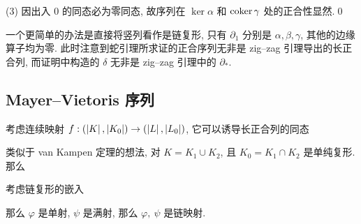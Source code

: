 \begin{Proof}
	(3) 因出入 $ 0 $ 的同态必为零同态, 故序列在 $ \ker\alpha $ 和 $ \mathrm{coker}\,\gamma $ 处的正合性显然.\qed
\end{Proof}

一个更简单的办法是直接将竖列看作是链复形, 只有 $ \partial_1 $ 分别是 $ \alpha,\beta,\gamma $, 其他的边缘算子均为零. 此时注意到蛇引理所求证的正合序列无非是 zig--zag 引理导出的长正合列, 而证明中构造的 $ \delta $ 无非是 zig--zag 引理中的 $ \partial_* $.

\subsection{Mayer--Vietoris 序列}

考虑连续映射 $ f : (\left| K \right| ,\left| K_0 \right| )\to(\left| L \right| ,\left| L_0 \right| ) $, 它可以诱导长正合列的同态
\begin{center}
\end{center}

类似于 van Kampen 定理的想法, 对 $ K=K_1\cup K_2 $, 且 $ K_0=K_1\cap K_2 $ 是单纯复形. 那么
\begin{center}
\end{center}
考虑链复形的嵌入
\begin{center}
\end{center}
那么 $ \varphi $ 是单射, $ \psi $ 是满射, 那么 $ \varphi,\ \psi $ 是链映射.

